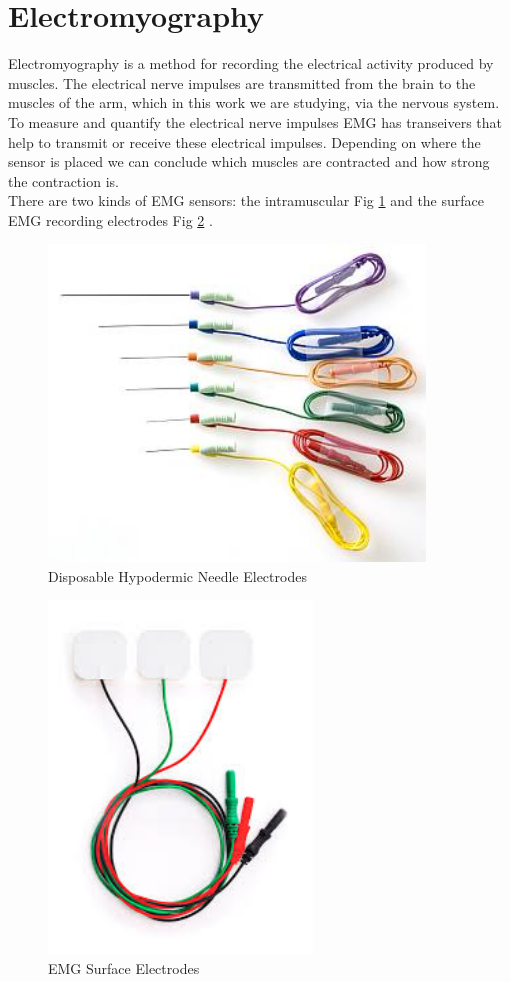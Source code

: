 \section{Electromyography}
Electromyography is a method for recording the electrical activity produced by muscles. The electrical nerve impulses are transmitted from the brain to the muscles of the arm, which in this work we are studying, via the nervous system. To measure and quantify the electrical nerve impulses EMG has transeivers that help to transmit or receive these electrical impulses. Depending on where the sensor is placed we can conclude which muscles are contracted and how strong the contraction is.\\
There are two kinds of EMG sensors: the intramuscular Fig \ref{Fig:intramuscular_needle} and the surface EMG recording electrodes Fig \ref{Fig:surface_emg_electrodes} .
\begin{figure}[h!]
\includegraphics[width=10cm,center,keepaspectratio]{figures/intramuscular_needle}
\caption{Disposable Hypodermic Needle Electrodes\cite{Disposable_Hypodermic_Needle_Electrodes}}
\label{Fig:intramuscular_needle}
\end{figure}
\begin{figure}[h!]
\includegraphics[width=7cm,center,keepaspectratio]{figures/surface_emg_electrodes}
\caption{EMG Surface Electrodes\cite{surface_emg_electrodes}}
\label{Fig:surface_emg_electrodes}
\end{figure}

